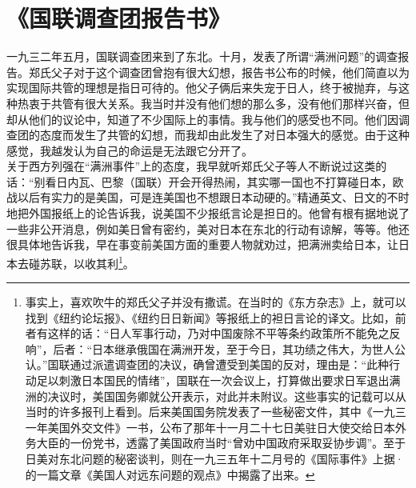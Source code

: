 \fancyhead[RO]{} %
\fancyhead[LE]{} %
\chapter*{《国联调查团报告书》}
\thispagestyle{empty}
一九三二年五月，国联调查团来到了东北。十月，发表了所谓“满洲问题”的调查报告。郑氏父子对于这个调查团曾抱有很大幻想，报告书公布的时候，他们简直以为实现国际共管的理想是指日可待的。他父子俩后来失宠于日人，终于被抛弃，与这种热衷于共管有很大关系。我当时并没有他们想的那么多，没有他们那样兴奋，但却从他们的议论中，知道了不少国际上的事情。我与他们的感受也不同。他们因调查团的态度而发生了共管的幻想，而我却由此发生了对日本强大的感觉。由于这种感觉，我越发认为自己的命运是无法跟它分开了。\\

关于西方列强在“满洲事件”上的态度，我早就听郑氏父子等人不断说过这类的话：“别看日内瓦、巴黎（国联）开会开得热闹，其实哪一国也不打算碰日本，欧战以后有实力的是美国，可是连美国也不想跟日本动硬的。”精通英文、日文的不时地把外国报纸上的论告诉我，说美国不少报纸言论是担日的。他曾有根有据地说了一些非公开消息，例如美日曾有密约，美对日本在东北的行动有谅解，等等。他还很具体地告诉我，早在事变前美国方面的重要人物就劝过，把满洲卖给日本，让日本去碰苏联，以收其利\footnote{事实上，喜欢吹牛的郑氏父子并没有撒谎。在当时的《东方杂志》上，就可以找到《纽约论坛报》、《纽约日日新闻》等报纸上的袒日言论的译文。比如，前者有这样的话：“日人军事行动，乃对中国废除不平等条约政策所不能免之反响”，后者：“日本继承俄国在满洲开发，至于今日，其功绩之伟大，为世人公认。”国联通过派遣调查团的决议，确曾遭受到美国的反对，理由是：“此种行动足以刺激日本国民的情绪”，国联在一次会议上，打算做出要求日军退出满洲的决议时，美国国务卿就公开表示，对此并未附议。这些事实的记载可以从当时的许多报刊上看到。后来美国国务院发表了一些秘密文件，其中《一九三一年美国外交文件》一书，公布了那年十一月二十七日美驻日大使交给日本外务大臣的一份党书，透露了美国政府当时“曾劝中国政府采取妥协步调”。至于日美对东北问题的秘密谈判，则在一九三五年十二月号的《国际事件》上据·的一篇文章《美国人对远东问题的观点》中揭露了出来。}。\\

